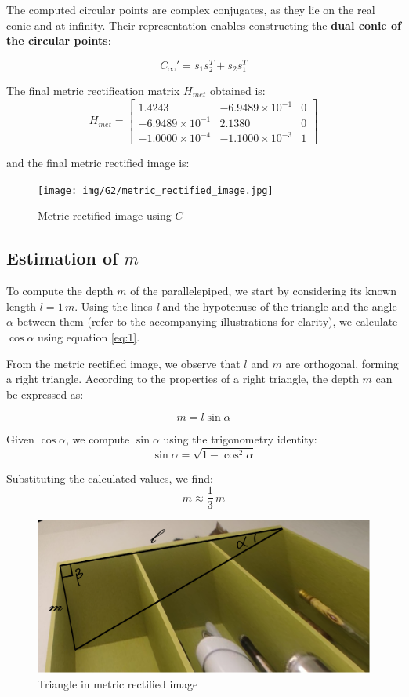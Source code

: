The computed circular points are complex conjugates, as they lie on the real conic and at infinity. Their representation enables constructing the \textbf{dual conic of the circular points}:

$$C_\infty' = s_1s_2^T + s_2s_1^T$$

The final metric rectification matrix $H_{met}$ obtained is:
\[
    \label{metricRectMatrix}
    H_{met}
    =
    \begin{bmatrix}
        1.4243 & -6.9489 \times 10^{-1} & 0 \\
        -6.9489 \times 10^{-1} & 2.1380 & 0 \\
        -1.0000 \times 10^{-4} & -1.1000 \times 10^{-3} & 1
    \end{bmatrix}
\]

and the final metric rectified image is:
\begin{figure}[H]
    \centering
    \texttt{[image: img/G2/metric\_rectified\_image.jpg]}
    \caption{Metric rectified image using $C$}
    \label{fig:metricRectificationUsingOneCircle}
\end{figure}

\subsection[Estimation of \textit{m} Lines]{Estimation of $m$}\label{estimationDepth}
To compute the depth $m$ of the parallelepiped, we start by considering its known length $l = 1 \, m$. Using the lines \textit{l} and the hypotenuse of the triangle and the angle $\alpha$ between them (refer to the accompanying illustrations for clarity), we calculate $\cos\alpha$ using equation \ref{eq:1}.

From the metric rectified image, we observe that $l$ and $m$ are orthogonal, forming a right triangle. According to the properties of a right triangle, the depth $m$ can be expressed as:

$$ m = l \sin\alpha$$

Given $\cos\alpha$, we compute $\sin\alpha$ using the trigonometry identity:
$$\sin\alpha =  \sqrt{1-\cos^2\alpha}$$

Substituting the calculated values, we find:
$$m \approx \frac{1}{3} \, m$$

\begin{figure}[H]
    \centering
    \includegraphics[width=0.7\linewidth]{img/triangleWithAngles.png}
    \caption{Triangle in metric rectified image}
    \label{fig:triangleWithAngles}
\end{figure}

